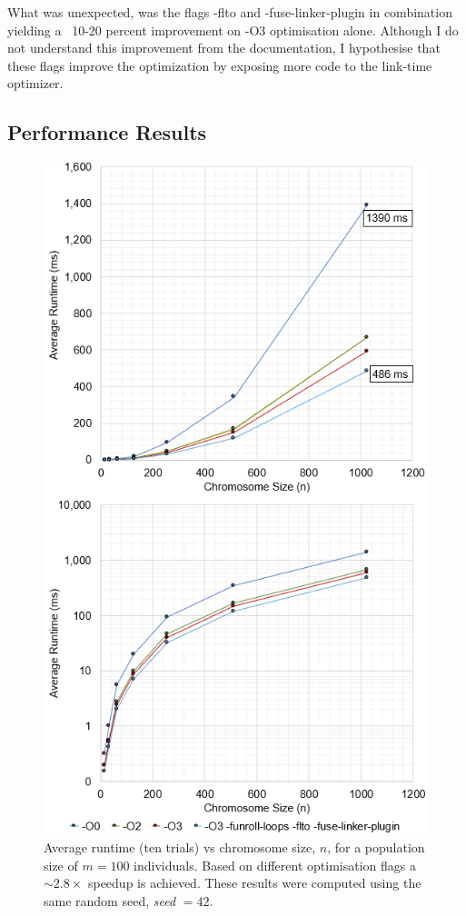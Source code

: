 \documentclass{report}
\begin{document}
What was unexpected, was the flags -flto and -fuse-linker-plugin in combination yielding a ~10-20 percent improvement on -O3 optimisation alone.  Although I do not  understand this improvement from the documentation, I hypothesise that these flags improve the optimization by exposing more code to the link-time optimizer. 

\subsection{Performance Results}
\label{serialperf}
\begin{figure}[H]
\centering
\includegraphics[scale=0.85]{avruntime2.png}
	\caption{Average runtime (ten trials) vs chromosome size, \(n\), for a population size of \(m=100\) individuals. Based on different optimisation flags a \(\sim 2.8\times\) speedup is achieved. These results were computed using the same random seed, \textit{seed }\(=42\).}
\end{figure}
\end{document}
